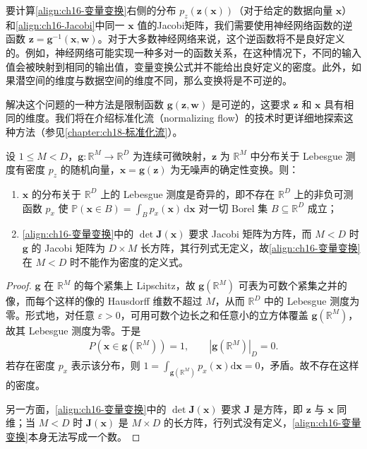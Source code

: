 \documentclass[../../main.tex]{subfiles}
\begin{document}
要计算\eqref{align:ch16-变量变换}右侧的分布 $p_z(\bm{z}(\bm{x}))$（对于给定的数据向量 $\bm{x}$）和\eqref{align:ch16-Jacobi}中同一 $\bm{x}$ 值的Jacobi矩阵，我们需要使用神经网络函数的逆函数 $\bm{z}=\bm{g}^{-1}(\bm{x},\bm{w})$。对于大多数神经网络来说，这个逆函数将不是良好定义的。例如，神经网络可能实现一种多对一的函数关系，在这种情况下，不同的输入值会被映射到相同的输出值，变量变换公式并不能给出良好定义的密度。此外，如果潜空间的维度与数据空间的维度不同，那么变换将是不可逆的。

解决这个问题的一种方法是限制函数 $\bm{g}(\bm{z},\bm{w})$ 是可逆的，这要求 $\bm{z}$ 和 $\bm{x}$ 具有相同的维度。我们将在介绍标准化流（normalizing flow）的技术时更详细地探索这种方法（参见\cref{chapter:ch18-标准化流}）。

\begin{proposition}[流形上的分布是奇异的]\label{proposition:ch16-流形奇异}
设 $1\leqslant M<D$，$\bm{g}:\mathbb{R}^{M}\rightarrow\mathbb{R}^{D}$ 为连续可微映射，$\bm{z}$ 为 $\mathbb{R}^{M}$ 中分布关于 Lebesgue 测度有密度 $p_z$ 的随机向量，$\bm{x}=\bm{g}(\bm{z})$ 为无噪声的确定性变换。则：
\begin{enumerate}
\item $\bm{x}$ 的分布关于 $\mathbb{R}^{D}$ 上的 Lebesgue 测度是奇异的，即不存在 $\mathbb{R}^{D}$ 上的非负可测函数 $p_x$ 使 $\mathbb{P}(\bm{x}\in B)=\int_{B}p_x(\bm{x})\,\mathrm{d}\bm{x}$ 对一切 Borel 集 $B\subseteq\mathbb{R}^{D}$ 成立；
\item \eqref{align:ch16-变量变换}中的 $\det\bm{J}(\bm{x})$ 要求 Jacobi 矩阵为方阵，而 $M<D$ 时 $\bm{g}$ 的 Jacobi 矩阵为 $D\times M$ 长方阵，其行列式无定义，故\eqref{align:ch16-变量变换}在 $M<D$ 时不能作为密度的定义式。
\end{enumerate}
\end{proposition}

\begin{proof}
$\bm{g}$ 在 $\mathbb{R}^{M}$ 的每个紧集上 Lipschitz，故 $\bm{g}(\mathbb{R}^{M})$ 可表为可数个紧集之并的像，而每个这样的像的 Hausdorff 维数不超过 $M$，从而 $\mathbb{R}^{D}$ 中的 Lebesgue 测度为零。形式地，对任意 $\varepsilon>0$，可用可数个边长之和任意小的立方体覆盖 $\bm{g}(\mathbb{R}^{M})$，故其 Lebesgue 测度为零。于是
\begin{align*}
  P\left(\bm{x}\in\bm{g}(\mathbb{R}^{M})\right)=1,\qquad \left|\bm{g}(\mathbb{R}^{M})\right|_{D}=0 .
\end{align*}
若存在密度 $p_x$ 表示该分布，则 $1=\int_{\bm{g}(\mathbb{R}^{M})}p_x(\bm{x})\mathrm{d}\bm{x}=0$，矛盾。故不存在这样的密度。

另一方面，\eqref{align:ch16-变量变换}中的 $\det\bm{J}(\bm{x})$ 要求 $\bm{J}$ 是方阵，即 $\bm{z}$ 与 $\bm{x}$ 同维；当 $M<D$ 时 $\bm{J}(\bm{x})$ 是 $M\times D$ 的长方阵，行列式没有定义，\eqref{align:ch16-变量变换}本身无法写成一个数。
\end{proof}
\end{document}
